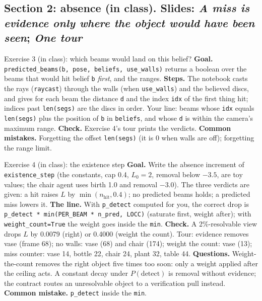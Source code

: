 \documentclass[11pt]{article}
\begin{document}
\subsection*{Section 2: absence (in class). Slides: \emph{A miss is evidence only where the object would have been seen}; \emph{One tour}}

\begin{labhelp}{Exercise 3 (in class): which beams would land on this belief?}
\textbf{Goal.} \texttt{predicted\_beams(b, pose, beliefs, use\_walls)} returns a boolean over the beams that would hit belief \texttt{b} \emph{first}, and the ranges. \textbf{Steps.} The notebook casts the rays (\texttt{raycast}) through the walls (when \texttt{use\_walls}) and the believed discs, and gives for each beam the distance \texttt{d} and the index \texttt{idx} of the first thing hit; indices past \texttt{len(segs)} are the discs in order. Your line: beams whose \texttt{idx} equals \texttt{len(segs)} plus the position of \texttt{b} in \texttt{beliefs}, and whose \texttt{d} is within the camera's maximum range. \textbf{Check.} Exercise 4's tour prints the verdicts. \textbf{Common mistakes.} Forgetting the offset \texttt{len(segs)} (it is 0 when walls are off); forgetting the range limit.
\end{labhelp}

\begin{labhelp}{Exercise 4 (in class): the existence step}
\textbf{Goal.} Write the absence increment of \texttt{existence\_step} (the constants, cap 0.4, $L_0=2$, removal below $-3.5$, are toy values; the chair agent uses birth 1.0 and removal $-3.0$). The three verdicts are given: a hit raises $L$ by $\min(n_{\text{hit}},0.4)$; no predicted beams holds; a predicted miss lowers it. \textbf{The line.} With \texttt{p\_detect} computed for you, the correct drop is \texttt{p\_detect * min(PER\_BEAM * n\_pred, LOCC)} (saturate first, weight after); with \texttt{weight\_count=True} the weight goes inside the \texttt{min}. \textbf{Check.} A 2\%-resolvable view drops $L$ by 0.0079 (right) or 0.4000 (weight the count). Tour: evidence removes vase (frame 68); no walls: vase (68) and chair (174); weight the count: vase (13); miss counter: vase 14, bottle 22, chair 24, plant 32, table 44. \textbf{Questions.} Weight-the-count removes the right object five times too soon: only a weight applied after the ceiling acts. A constant decay under $P(\text{detect})$ is removal without evidence; the contract routes an unresolvable object to a verification pull instead. \textbf{Common mistake.} \texttt{p\_detect} inside the \texttt{min}.
\end{labhelp}
\end{document}
